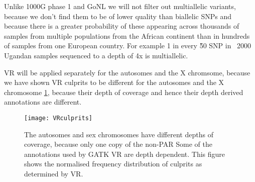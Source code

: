 

Unlike \gls{1000G} phase 1 and \gls{GoNL} we will not filter out multiallelic variants, because we don't find them to be of lower quality than biallelic SNPs and because there is a greater probability of these appearing across thousands of samples from multiple populations from the African continent than in hundreds of samples from one European country. For example 1 in every \~50 SNP in ~2000 Ugandan samples sequenced to a depth of 4x is multiallelic.

\gls{VR} will be applied separately for the autosomes and the X chromsome, because we have shown \gls{VR} culprits to be different for the autosomes and the X chromosome \ref{fig:VRculprits}, because their depth of coverage and hence their depth derived annotations are different.

\begin{figure}[!htbp]
\centering
\texttt{[image: VRculprits]}
\caption[Distribution of variant filtering culprits for the autosomes and sex chromosomes.]{The autosomes and sex chromosomes have different depths of coverage, because only one copy of the non-\gls{PAR} Some of the annotations used by \gls{GATK} \gls{VR} are depth dependent. This figure shows the normalised frequency distribution of culprits as determined by \gls{VR}.}
\label{fig:VRculprits}
\end{figure}


